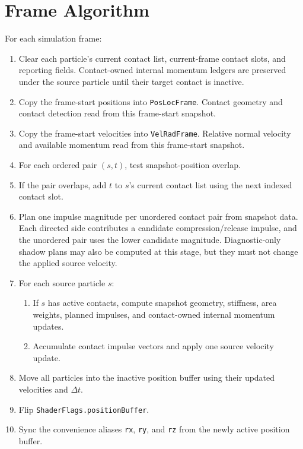 \section{Frame Algorithm}
\label{sec:frame-algorithm}

For each simulation frame:

\begin{enumerate}[leftmargin=*]
    \item Clear each particle's current contact list, current-frame contact
    slots, and reporting fields.  Contact-owned internal momentum ledgers are
    preserved under the source particle until their target contact is inactive.
    \item Copy the frame-start positions into \texttt{PosLocFrame}.  Contact
    geometry and contact detection read from this frame-start snapshot.
    \item Copy the frame-start velocities into \texttt{VelRadFrame}.  Relative
    normal velocity and available momentum read from this frame-start snapshot.
    \item For each ordered pair $(s,t)$, test snapshot-position overlap.
    \item If the pair overlaps, add $t$ to $s$'s current contact list using the
    next indexed contact slot.
    \item Plan one impulse magnitude per unordered contact pair from snapshot
    data.  Each directed side contributes a candidate compression/release
    impulse, and the unordered pair uses the lower candidate magnitude.
    Diagnostic-only shadow plans may also be computed at this stage, but they
    must not change the applied source velocity.
    \item For each source particle $s$:
    \begin{enumerate}[leftmargin=*]
        \item If $s$ has active contacts, compute snapshot geometry, stiffness,
        area weights, planned impulses, and contact-owned internal momentum
        updates.
        \item Accumulate contact impulse vectors and apply one source velocity
        update.
    \end{enumerate}
    \item Move all particles into the inactive position buffer using their
    updated velocities and $\Delta t$.
    \item Flip \texttt{ShaderFlags.positionBuffer}.
    \item Sync the convenience aliases \texttt{rx}, \texttt{ry}, and
    \texttt{rz} from the newly active position buffer.
\end{enumerate}


